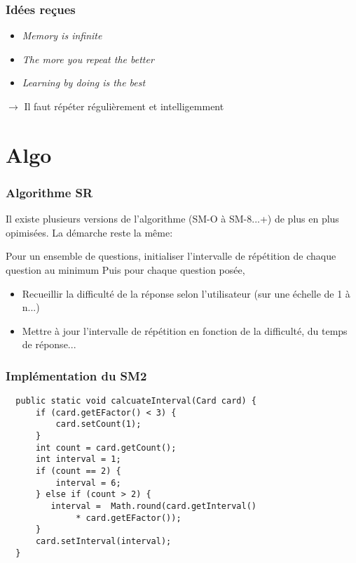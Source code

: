 \documentclass[12pt]{beamer}
\begin{document}
\begin{frame}
  \frametitle{Idées reçues}
  \begin{itemize}
    \item \textit{Memory is infinite}
    \item \textit{The more you repeat the better}
    \item \textit{Learning by doing is the best}
  \end{itemize}
  
  \alert{$\rightarrow$ Il faut répéter régulièrement et intelligemment}
\end{frame}


\section{Algo}
\begin{frame}
  \frametitle{Algorithme SR}
  Il existe plusieurs versions de l'algorithme (SM-O à SM-8...+) de plus
  en plus opimisées. La démarche reste la même:
  
  Pour un ensemble de questions, initialiser l'intervalle de répétition de chaque question au minimum
  Puis pour chaque question posée,
  \begin{itemize}
   \item Recueillir la difficulté de la réponse selon l'utilisateur (sur une échelle de 1 à n...)
   \item Mettre à jour l'intervalle de répétition en fonction de la difficulté, du temps de réponse...
  \end{itemize}

\end{frame}


\begin{frame}[fragile]
  \frametitle{Implémentation du SM2}
  \begin{lstlisting}
  public static void calcuateInterval(Card card) {
      if (card.getEFactor() < 3) {
          card.setCount(1);
      }
      int count = card.getCount();
      int interval = 1;
      if (count == 2) {
          interval = 6;
      } else if (count > 2) {
         interval =  Math.round(card.getInterval() 
		      * card.getEFactor());
      }
      card.setInterval(interval);
  }
  \end{lstlisting}
\end{frame}
\end{document}
